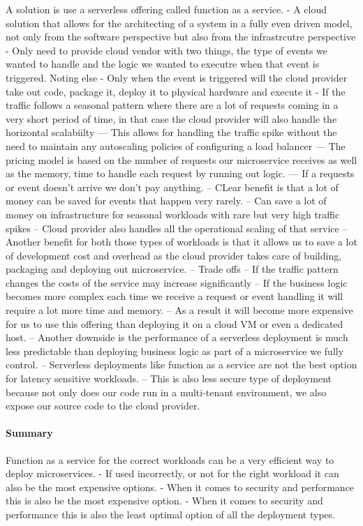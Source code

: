 \documentclass[a4paper, 11pt]{book}
\begin{document}
    A solution is use a serverless offering called function as a service.
    - A cloud solution that allows for the architecting of a system in a fully even driven model, not only from the software perspective but also from the infrastrcutre perspective
    - Only need to provide cloud vendor with two things, the type of events we wanted to handle and the logic we wanted to executre when that event is triggered. Noting else
    - Only when the event is triggered will the cloud provider take out code, package it, deploy it to physical hardware and execute it
    - If the traffic follows a seasonal pattern where there are a lot of requests coming in a very short period of time, in that case the cloud provider will also handle the horizontal scalabiilty
    --- This allows for handling the traffic spike without the need to maintain any autoscaling policies of configuring a load balancer
    --- The pricing model is based on the number of requests our microservice receives as well as the memory, time to handle each request by running out logic.
    --- If a requests or event doesn't arrive we don't pay anything.
    -- CLear benefit is that a lot of money can be saved for events that happen very rarely.
    -- Can save a lot of money on infrastructure for seasonal workloads with rare but very high traffic spikes
    -- Cloud provider also handles all the operational scaling of that service
    -- Another benefit for both those types of workloads is that it allows us to save a lot of development cost and overhead as the cloud provider takes care of building, packaging and deploying out microservice.
    -- Trade offs
    -- If the traffic pattern changes the costs of the service may increase significantly
    -- If the business logic becomes more complex each time we receive a request or event handling it will require a lot more time and memory.
    -- As a result it will become more expensive for us to use this offering than deploying it on a cloud VM or even a dedicated host.
    -- Another downside is the performance of a serverless deployment is much less predictable than deploying business logic as part of a microservice we fully control.
    -- Serverless deployments like function as a service are not the best option for latency sensitive workloads.
    -- This is also less secure type of deployment because not only does our code run in a multi-tenant environment, we also expose our source code to the cloud provider.

    \paragraph{Summary}
    Function as a service for the correct workloads can be a very efficient way to deploy microservices.
    - If used incorrectly, or not for the right workload it can also be the most expensive options.
    - When it comes to security and performance this is also be the most expensive option.
    - When it comes to security and performance this is also the least optimal option of all the deployment types.
\end{document}
